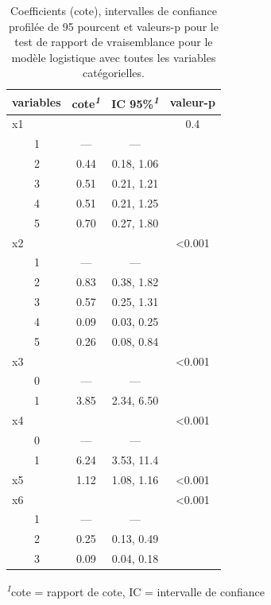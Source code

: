 \documentclass[
  11pt,
  letterpaper,
]{scrbook}
\theoremstyle{definition}
\theoremstyle{remark}
\begin{document}
\hypertarget{tbl-logit1-complet}{}
\setlength{\LTpost}{0mm}
\begin{longtable}{lccc}
\caption{\label{tbl-logit1-complet}Coefficients (cote), intervalles de confiance profilée de 95 pourcent et
valeurs-p pour le test de rapport de vraisemblance pour le modèle
logistique avec toutes les variables catégorielles. }\tabularnewline

\toprule
variables & cote\textsuperscript{\textit{1}} & IC 95\%\textsuperscript{\textit{1}} & valeur-p \\ 
\midrule
x1 &  &  & 0.4 \\ 
    1 & — & — &  \\ 
    2 & 0.44 & 0.18, 1.06 &  \\ 
    3 & 0.51 & 0.21, 1.21 &  \\ 
    4 & 0.51 & 0.21, 1.25 &  \\ 
    5 & 0.70 & 0.27, 1.80 &  \\ 
x2 &  &  & <0.001 \\ 
    1 & — & — &  \\ 
    2 & 0.83 & 0.38, 1.82 &  \\ 
    3 & 0.57 & 0.25, 1.31 &  \\ 
    4 & 0.09 & 0.03, 0.25 &  \\ 
    5 & 0.26 & 0.08, 0.84 &  \\ 
x3 &  &  & <0.001 \\ 
    0 & — & — &  \\ 
    1 & 3.85 & 2.34, 6.50 &  \\ 
x4 &  &  & <0.001 \\ 
    0 & — & — &  \\ 
    1 & 6.24 & 3.53, 11.4 &  \\ 
x5 & 1.12 & 1.08, 1.16 & <0.001 \\ 
x6 &  &  & <0.001 \\ 
    1 & — & — &  \\ 
    2 & 0.25 & 0.13, 0.49 &  \\ 
    3 & 0.09 & 0.04, 0.18 &  \\ 
\bottomrule
\end{longtable}
\begin{minipage}{\linewidth}
\textsuperscript{\textit{1}}cote = rapport de cote, IC = intervalle de confiance\\
\end{minipage}
\end{document}

